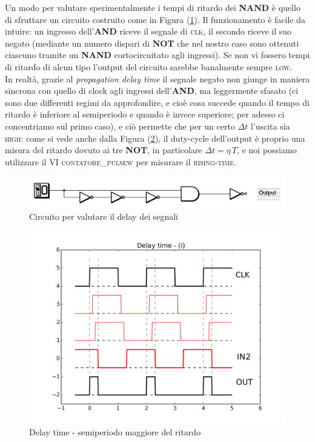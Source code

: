 \documentclass[journal, a4paper]{IEEEtran}
\begin{document}
Un modo per valutare sperimentalmente i tempi di ritardo dei \textbf{NAND} è quello di sfruttare un circuito costruito come in Figura (\ref{fig:es2_circuit}). Il funzionamento è facile da intuire: un ingresso dell'\textbf{AND} riceve il segnale di \textsc{clk}, il secondo riceve il suo negato (mediante un numero dispari di \textbf{NOT} che nel nostro caso sono ottenuti ciascuno tramite un \textbf{NAND} cortocircuitato agli ingressi). Se non vi fossero tempi di ritardo di alcun tipo l'output del circuito sarebbe banalmente sempre \textsc{low}. \\
In realtà, grazie al \textit{propagation delay time} il segnale negato non giunge in maniera sincrona con quello di clock agli ingressi dell'\textbf{AND}, ma leggermente sfasato (ci sono due differenti regimi da approfondire, e cioè cosa succede quando il tempo di ritardo è inferiore al semiperiodo e quando è invece superiore; per adesso ci concentriamo sul primo caso), e ciò permette che per un certo $\Delta t$ l'uscita sia \textsc{high}: come si vede anche dalla Figura (\ref{fig:delay1}), il duty-cycle dell'output è proprio una misura del ritardo dovuto ai tre \textbf{NOT}, in particolare $\Delta t = \eta \, T$, e noi possiamo utilizzare il VI \textsc{contatore\_pulsew} per misurare il \textsc{rising-time}.\\



\begin{figure}
\centering
\includegraphics[width=0.7\linewidth]{./es2_circuit}
\caption{Circuito per valutare il delay dei segnali}
\label{fig:es2_circuit}
\end{figure}

\begin{figure}
\centering
\includegraphics[width=0.7\linewidth]{./delay1}
\caption{Delay time - semiperiodo maggiore del ritardo}
\label{fig:delay1}
\end{figure}
\end{document}
